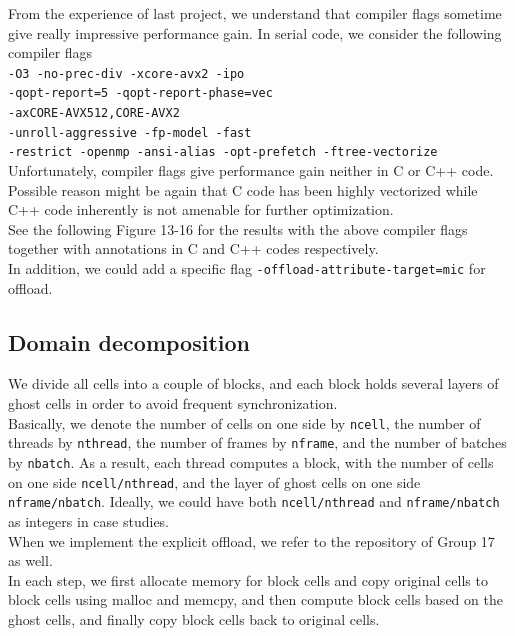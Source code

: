 \documentclass[12pt]{article}
\numberwithin{equation}{section}
\begin{document}
\normalsize
From the experience of last project, we understand that compiler flags sometime give really impressive performance gain.
In serial code, we consider the following compiler flags
\\
\texttt{-O3 -no-prec-div -xcore-avx2 -ipo \\
	-qopt-report=5 -qopt-report-phase=vec \\
	-axCORE-AVX512,CORE-AVX2 \\
	-unroll-aggressive -fp-model -fast \\
	-restrict -openmp -ansi-alias -opt-prefetch -ftree-vectorize
}
\\
Unfortunately, compiler flags give performance gain neither in C or C++ code. Possible reason might be again that C code has been highly vectorized while C++ code inherently is not amenable for further optimization.
\\
See the following Figure 13-16 for the results with the above compiler flags together
with annotations in C and C++ codes respectively.
\\
In addition, we could add a specific flag \texttt{-offload-attribute-target=mic} for offload.

\subsection{Domain decomposition}

We divide all cells into a couple of blocks, and each block holds several layers of ghost cells in order to avoid frequent synchronization.
\\
Basically, we denote the number of cells on one side by \texttt{ncell}, the number of threads by \texttt{nthread}, the number of frames by \texttt{nframe}, and the number of batches by \texttt{nbatch}. As a result, each thread computes a block, with the number of cells on one side \texttt{ncell/nthread}, and the layer of ghost cells on one side \texttt{nframe/nbatch}. Ideally, we could have both \texttt{ncell/nthread} and \texttt{nframe/nbatch} as integers in case studies.
\\
When we implement the explicit offload, we refer to the repository of Group 17 as well.
\\
In each step, we first allocate memory for block cells and copy original cells to block cells using malloc and memcpy, and then compute block cells based on the ghost cells, and finally copy block cells back to original cells.
\end{document}
